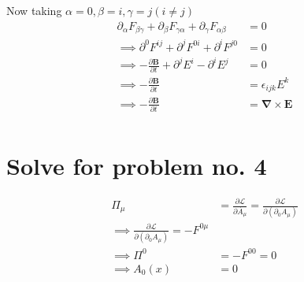 \documentclass[12pt, letterpaper]{article}
\newcommand*{\1}{\hspace{1pt}}
\begin{document}
Now taking $\alpha=0, \beta=i, \gamma=j (i\neq j)$
\begin{align*}
    \partial_{\alpha} F_{\beta \gamma} + \partial_{\beta} F_{\gamma \alpha} + \partial_{\gamma} F_{\alpha \beta} &= 0\\
    \implies \partial^{0} F^{ij} + \partial^{j} F^{0i} + \partial^{i} F^{j0} &= 0\\
    \implies -\frac{\partial \boldsymbol{B}}{\partial t} + \partial^{j} E^{i} - \partial^{i} E^{j} &= 0\\
    \implies -\frac{\partial \boldsymbol{B}}{\partial t} &= \epsilon_{ijk} E^{k} \\
    \implies -\frac{\partial \boldsymbol{B}}{\partial t} &= \boldsymbol{\nabla} \times \boldsymbol{E} \\
\end{align*}

\section*{Solve for problem no. 4}

\begin{align*}
    \Pi  _{\mu} &= \frac{\partial \mathcal{L}}{\partial \dot{A_{\mu}} } = \frac{\partial \mathcal{L}}{\partial (\partial _{0}A_{\mu})}  \\
    \implies \frac{\partial \mathcal{L}}{\partial (\partial _{0}A_{\mu})} = - F^{0\mu} \\
    \implies \Pi ^{0} &= - F^{00} = 0 \\
    \implies A_{0} (x) &= 0 \\
\end{align*}
\end{document}
